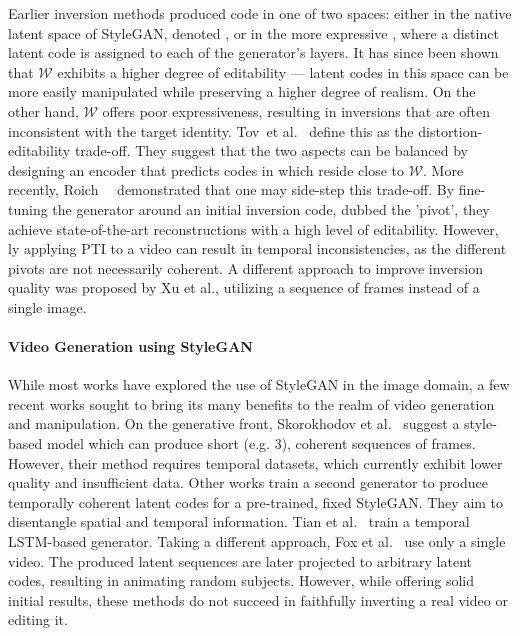 Earlier inversion methods produced code in one of two spaces: either in the native latent space of StyleGAN, denoted \w, or in the more expressive \wplus, where a distinct latent code is assigned to each of the generator's layers.
It has since been shown ~\cite{zhu2020improved, tov2021designing} that $\mathcal{W}$ exhibits a higher degree of editability --- latent codes in this space can be more easily manipulated while preserving a higher degree of realism. On the other hand, $\mathcal{W}$ offers poor expressiveness, resulting in inversions that are often inconsistent with the target identity.
Tov~et al.~\cite{tov2021designing} define this as the distortion-editability trade-off. They suggest that the two aspects can be balanced by designing an encoder that predicts codes in \wplus which reside close to $\mathcal{W}$. 
More recently, Roich~\etal~ demonstrated that one may side-step this trade-off. By fine-tuning the generator around an initial inversion code, dubbed the 'pivot', they achieve state-of-the-art reconstructions with a high level of editability. 
However, {\naive}ly applying PTI to a video can result in temporal inconsistencies, as the different pivots are not necessarily coherent. A different approach to improve inversion quality was proposed by Xu et al., utilizing a sequence of frames instead of a single image. 

\paragraph{Video Generation using StyleGAN}

While most works have explored the use of StyleGAN in the image domain, a few recent works sought to bring its many benefits to the realm of video generation and manipulation.
On the generative front, 
Skorokhodov et al.~ suggest a style-based model which can produce short (e.g. $3$), coherent sequences of frames. However, their method requires temporal datasets, which currently exhibit lower quality and insufficient data.
Other works \cite{fox2021stylevideogan, tian2021good} train a second generator to produce temporally coherent latent codes for a pre-trained, fixed StyleGAN. They aim to disentangle spatial and temporal information. Tian et al.~ train a temporal LSTM-based generator.
Taking a different approach, Fox et al.~ use only a single video. The produced latent sequences are later projected to arbitrary latent codes, resulting in animating random subjects. 
However, while offering solid initial results, these methods do not succeed in faithfully inverting a real video or editing it.

